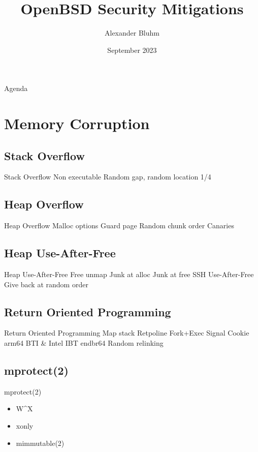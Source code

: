 \documentclass[14pt]{beamer}
\author{Alexander Bluhm}
\title{OpenBSD Security Mitigations}
\institute{genua GmbH\\ \url{bluhm@genua.de}\\ \url{bluhm@openbsd.org}}
\date{September 2023}
\begin{document}
\lstset{language=C}

\begin{frame}
\titlepage
\end{frame}

\begin{frame}{Agenda}
\setcounter{tocdepth}{1}
\tableofcontents
\end{frame}

\section{Memory Corruption}

\subsection{Stack Overflow}
\begin{frame}{Stack Overflow}
Non executable
Random gap, random location 1/4
\end{frame}

\subsection{Heap Overflow}
\begin{frame}{Heap Overflow}
Malloc options
Guard page
Random chunk order
Canaries
\end{frame}

\subsection{Heap Use-After-Free}
\begin{frame}{Heap Use-After-Free}
Free unmap
Junk at alloc
Junk at free
SSH Use-After-Free
Give back at random order
\end{frame}

\subsection{Return Oriented Programming}
\begin{frame}{Return Oriented Programming}
Map stack
Retpoline
Fork+Exec
Signal Cookie
arm64 BTI \& Intel IBT endbr64
Random relinking
\end{frame}

\subsection{mprotect(2)}
\begin{frame}{mprotect(2)}
\begin{itemize}
\item W\^{}X
\item xonly
\item mimmutable(2)
\end{itemize}
\end{frame}
\end{document}
